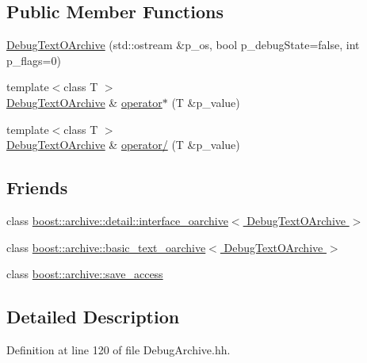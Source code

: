 \subsection*{Public Member Functions}
\begin{DoxyCompactItemize}
\item 
\hyperlink{classxtd_1_1serializer_1_1DebugTextOArchive_ac8705c1c468911d8b0c74b29156a8b8e}{Debug\-Text\-O\-Archive} (std\-::ostream \&p\-\_\-os, bool p\-\_\-debug\-State=false, int p\-\_\-flags=0)
\item 
{\footnotesize template$<$class T $>$ }\\\hyperlink{classxtd_1_1serializer_1_1DebugTextOArchive}{Debug\-Text\-O\-Archive} \& \hyperlink{classxtd_1_1serializer_1_1DebugTextOArchive_a03483bda8da712cbd5f789bcd3c20659}{operator$\ast$} (T \&p\-\_\-value)
\item 
{\footnotesize template$<$class T $>$ }\\\hyperlink{classxtd_1_1serializer_1_1DebugTextOArchive}{Debug\-Text\-O\-Archive} \& \hyperlink{classxtd_1_1serializer_1_1DebugTextOArchive_ab5bd315f1a6d164814d0ae28fca9ab1d}{operator/} (T \&p\-\_\-value)
\end{DoxyCompactItemize}
\subsection*{Friends}
\begin{DoxyCompactItemize}
\item 
class \hyperlink{classxtd_1_1serializer_1_1DebugTextOArchive_a162d16419084090d0d406eb1f23dfa6d}{boost\-::archive\-::detail\-::interface\-\_\-oarchive$<$ Debug\-Text\-O\-Archive $>$}
\item 
class \hyperlink{classxtd_1_1serializer_1_1DebugTextOArchive_ac712c773113f2ae2a71ee1f638877ab2}{boost\-::archive\-::basic\-\_\-text\-\_\-oarchive$<$ Debug\-Text\-O\-Archive $>$}
\item 
class \hyperlink{classxtd_1_1serializer_1_1DebugTextOArchive_aaca003bb8a4fc59424e4025130da4edd}{boost\-::archive\-::save\-\_\-access}
\end{DoxyCompactItemize}


\subsection{Detailed Description}


Definition at line 120 of file Debug\-Archive.\-hh.



